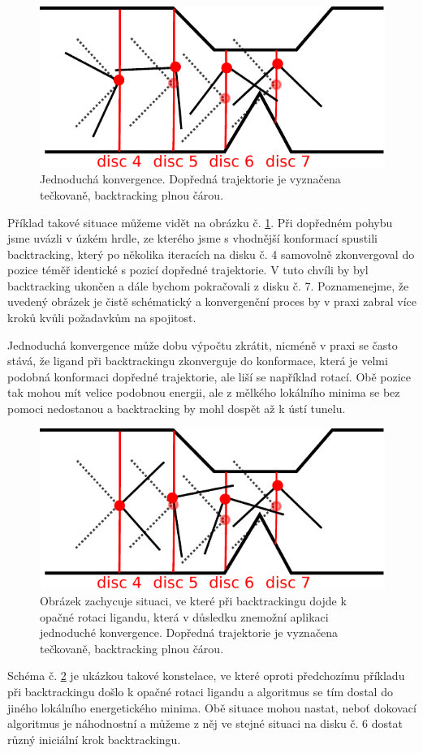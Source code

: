 \begin{figure}[ht]
\centering
\includegraphics[width=.5\hsize]{img/backtracking_simple.pdf}
\caption{Jednoduchá konvergence. Dopředná trajektorie je vyznačena tečkovaně,
backtracking plnou čárou.
}
\label{fig:simple_convergence}
\end{figure}


Příklad takové situace můžeme vidět na obrázku č. \ref{fig:simple_convergence}.
Při dopředném pohybu jsme uvázli v úzkém hrdle, ze kterého jsme s vhodnější
konformací spustili backtracking, který po několika iteracích na disku č. 4
samovolně zkonvergoval do pozice téměř identické s pozicí dopředné trajektorie.
V tuto chvíli by byl backtracking ukončen a dále bychom pokračovali z disku č. 7.
Poznamenejme, že uvedený obrázek je čistě schématický a konvergenční proces
by v praxi zabral více kroků kvůli požadavkům na spojitost.

Jednoduchá konvergence může dobu výpočtu zkrátit, nicméně v praxi se často stává,
že ligand při backtrackingu zkonverguje do konformace, která je velmi podobná
konformaci dopředné trajektorie, ale liší se například rotací. Obě pozice tak
mohou mít velice podobnou energii, ale z mělkého lokálního minima se bez pomoci
nedostanou a backtracking by mohl dospět až k ústí tunelu.

\begin{figure}[ht]
\centering
\includegraphics[width=.5\hsize]{img/backtracking_bad_rotation.pdf}
\caption{Obrázek zachycuje situaci, ve které při backtrackingu dojde k opačné
rotaci ligandu, která v důsledku znemožní aplikaci jednoduché konvergence.
Dopředná trajektorie je vyznačena tečkovaně, backtracking plnou čárou.
}
\label{fig:backtracking_bad}
\end{figure}

Schéma č. \ref{fig:backtracking_bad} je ukázkou takové konstelace, ve které
oproti předchozímu příkladu při backtrackingu došlo k opačné rotaci ligandu
a algoritmus se tím dostal do jiného lokálního energetického minima. Obě situace
mohou nastat, neboť dokovací algoritmus je náhodnostní a můžeme z něj ve stejné
situaci na disku č. 6 dostat různý iniciální krok backtrackingu.

